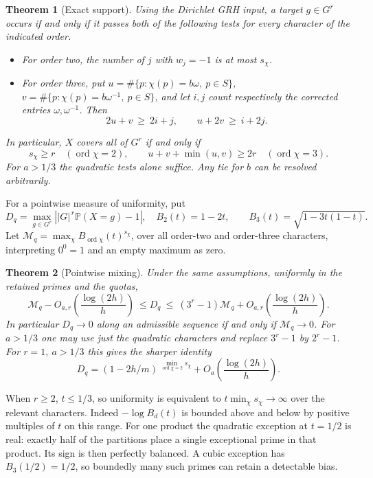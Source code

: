 \documentclass[11pt,letterpaper]{article}
\newtheorem{theorem}{Theorem}
\newcommand{\pr}{\mathbb P}
\newcommand{\abs}[1]{\lvert#1\rvert}
\begin{document}
\begin{theorem}[Exact support]\label{th:support}
Using the Dirichlet GRH input, a target \(g\in G^r\) occurs if and only if it passes both of the following tests for every character of the indicated order.
\begin{itemize}
\item For order two, the number of \(j\) with \(w_j=-1\) is at most \(s_\chi\).
\item For order three, put \(u=\#\{p:\chi(p)=b\omega,\ p\in S\}\), \(v=\#\{p:\chi(p)=b\omega^{-1},\ p\in S\}\), and let \(i,j\) count respectively the corrected entries \(\omega,\omega^{-1}\). Then
\begin{equation}\label{eq:polygon}
             2u+v\ \ge\ 2i+j,\qquad u+2v\ \ge\ i+2j .
\end{equation}
\end{itemize}
In particular, \(X\) covers all of \(G^r\) if and only if
\begin{equation}\label{eq:coverage}
  s_\chi\ge r\quad(\operatorname{ord}\chi=2),\qquad
  u+v+\min(u,v)\ge 2r\quad(\operatorname{ord}\chi=3).
\end{equation}
For \(a>1/3\) the quadratic tests alone suffice. Any tie for \(b\) can be resolved arbitrarily.
\end{theorem}

For a pointwise measure of uniformity, put
\[
 D_q=\max_{g\in G^r}\left|\abs{G}^{\,r}\pr(X=g)-1\right|,\quad
 B_2(t)=1-2t,\qquad B_3(t)=\sqrt{1-3t(1-t)}.
\]
Let \(\mathcal M_q=\max_\chi B_{\operatorname{ord}\chi}(t)^{s_\chi}\), over all order-two and order-three characters, interpreting \(0^0=1\) and an empty maximum as zero.

\begin{theorem}[Pointwise mixing]\label{th:mix}
Under the same assumptions, uniformly in the retained primes and the quotas,
\[
 \mathcal M_q-O_{a,r}\!\left(\frac{\log(2h)}h\right)
 \ \le D_q\ \le\
 (3^r-1)\mathcal M_q+O_{a,r}\!\left(\frac{\log(2h)}h\right).
\]
In particular \(D_q\to0\) along an admissible sequence if and only if \(\mathcal M_q\to0\). For \(a>1/3\) one may use just the quadratic characters and replace \(3^r-1\) by \(2^r-1\). For \(r=1,\ a>1/3\) this gives the sharper identity
\[
 D_q=(1-2h/m)^{\,\min_{\operatorname{ord}\chi=2}s_\chi}
             +O_a\!\left(\frac{\log(2h)}h\right).
\]
\end{theorem}

When \(r\ge2\), \(t\le 1/3\), so uniformity is equivalent to \(t\min_\chi s_\chi\to\infty\) over the relevant characters. Indeed \(-\log B_d(t)\) is bounded above and below by positive multiples of \(t\) on this range. For one product the quadratic exception at \(t=1/2\) is real: exactly half of the partitions place a single exceptional prime in that product. Its sign is then perfectly balanced. A cubic exception has \(B_3(1/2)=1/2\), so boundedly many such primes can retain a detectable bias.
\end{document}
